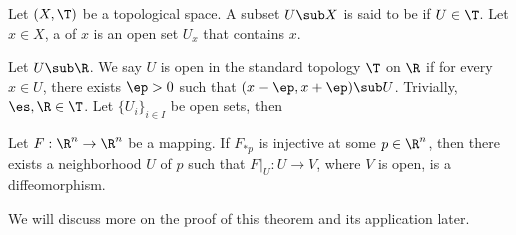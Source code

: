 \documentclass[10pt]{article}
\begin{document}
\begin{definition}
    Let $(X,\T)$ be a topological space. A subset $U\sub X$ is said to be  if $U\in\T$. Let $x\in X$, a  of $x$ is an open set ${U}_{x}$ that contains $x$.
\end{definition}
\par
Let $U\sub\R$. We say $U$ is open in the standard topology $\T$ on $\R$ if for every $x\in U$, there exists $\ep>0$ such that $(x-\ep,x+\ep)\sub U$. Trivially, $\es,\R\in\T$. Let ${\{{U}_{i}\}}_{i\in I}$ be open sets, then 





\begin{theorem}
    Let $F:{\R}^{n}\to{\R}^{n}$ be a mapping. If ${F}_{*p}$ is injective at some $p\in{\R}^{n}$, then there exists a neighborhood $U$ of $p$ such that $F{\vert}_{U}:U\to V$, where $V$ is open, is a diffeomorphism.
\end{theorem}
\par
We will discuss more on the proof of this theorem and its application later.
\end{document}
